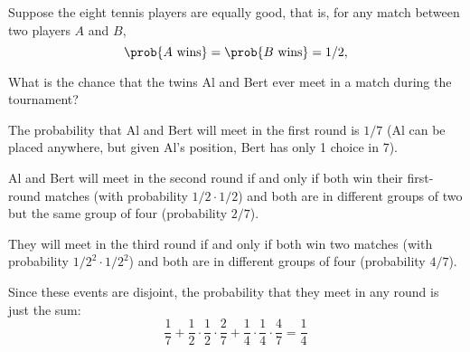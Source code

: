 \begin{problem}
\ppart Suppose the eight tennis players are equally good, that is, for
any match between two players $A$ and $B$,
\[
\prob{A \mbox{ wins}}=\prob{B \mbox{ wins}}= 1/2,
\]

What is the chance that the twins Al and Bert ever meet in a match
during the tournament?

\begin{solution}

The probability that Al and Bert will meet in the first round is $1/7$
(Al can be placed anywhere, but given Al's position, Bert has only 1
choice in 7).

Al and Bert will meet in the second round if and only if both win
their first-round matches (with probability $1/2 \cdot 1/2$) and both
are in different groups of two but the same group of four (probability
$2/7$).

They will meet in the third round if and only if both win two matches
(with probability $1/2^2 \cdot 1/2^2$) and both are in different
groups of four (probability $4/7$).

Since these events are disjoint, the probability that they meet in any
round is just the sum:
\[
\frac{1}{7} + \frac{1}{2} \cdot \frac{1}{2} \cdot \frac{2}{7}
+ \frac{1}{4} \cdot \frac{1}{4} \cdot \frac{4}{7} = \frac{1}{4}
\]
\end{solution}

\eparts

\end{problem}


